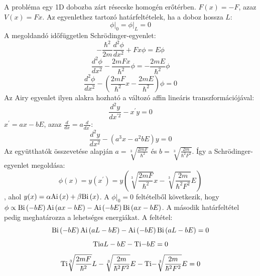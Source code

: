 A probléma egy 1D dobozba zárt résecske homogén erőtérben. $F(x)=-F$, azaz $V(x) = Fx$.
	Az egyenlethez tartozó határfeltételek, ha a doboz hossza $L$:
	\begin{equation}
		\phi \big\rvert_0 = \phi \big \rvert_L = 0
	\end{equation}
	A megoldandó időfüggetlen Schrödinger-egyenlet:
	\begin{equation}
		-\frac{\hbar^2}{2m}\frac{d^2\phi}{dx^2} + Fx\phi = E\phi
	\end{equation}
	\begin{equation}
		\frac{d^2\phi}{dx^2} - \frac{2mFx}{\hbar^2}\phi = -\frac{2mE}{\hbar^2}\phi
	\end{equation}
	\begin{equation}
		\frac{d^2\phi}{dx^2} - \left(\frac{2mF}{\hbar^2}x - \frac{2mE}{\hbar^2}\right)\phi = 0
	\end{equation}
	Az Airy egyenlet ilyen alakra hozható a változó affin lineáris transzformációjával:
	\begin{equation}
		\frac{d^2y}{dx^{\prime 2}} - x^\prime y = 0
	\end{equation}
	$x^\prime = ax - bE$, azaz $\frac{d}{dx} = a\frac{d}{dx^\prime}$:
	\begin{equation}
		\frac{d^2y}{dx^2} - \left(a^3x - a^2bE\right)y = 0
	\end{equation}
	Az együtthatók összevetése alapján $a = \sqrt[3]{\frac{2mF}{\hbar^2}}$ és $b = \sqrt[3]{\frac{2m}{\hbar^2F^2}}$. Így a Schrödinger-egyenlet megoldása:
	\begin{equation}
		\phi(x) = y(x^\prime) = y\left(\sqrt[3]{\frac{2mF}{\hbar^2}}x - \sqrt[3]{\frac{2m}{\hbar^2F^2}}E\right)
	\end{equation}
	, ahol $y(x) = \alpha \mathrm{Ai}\left(x\right) + \beta \mathrm{Bi}\left(x\right)$.
	A $\phi \big\rvert_0 = 0$ feltételből következik, hogy $\phi \propto \mathrm{Bi}\left(-bE\right)\mathrm{Ai}\left(ax-bE\right) - \mathrm{Ai}\left(-bE\right)\mathrm{Bi}\left(ax-bE\right)$. A második határfeltétel pedig meghatározza a lehetséges energiákat. A feltétel:
	\begin{equation}
		\mathrm{Bi}\left(-bE\right)\mathrm{Ai}\left(aL-bE\right) - \mathrm{Ai}\left(-bE\right)\mathrm{Bi}\left(aL-bE\right) = 0
	\end{equation}
	\begin{equation}
		\label{box_energiaszintek_egyenlet}
		\mathrm{Ti}{aL-bE} - \mathrm{Ti}{-bE} = 0
	\end{equation}
	\begin{equation}
		\mathrm{Ti}{\sqrt[3]{\frac{2mF}{\hbar^2}}L - \sqrt[3]{\frac{2m}{\hbar^2F^2}}E} - \mathrm{Ti}{-\sqrt[3]{\frac{2m}{\hbar^2F^2}}E} = 0
	\end{equation}
